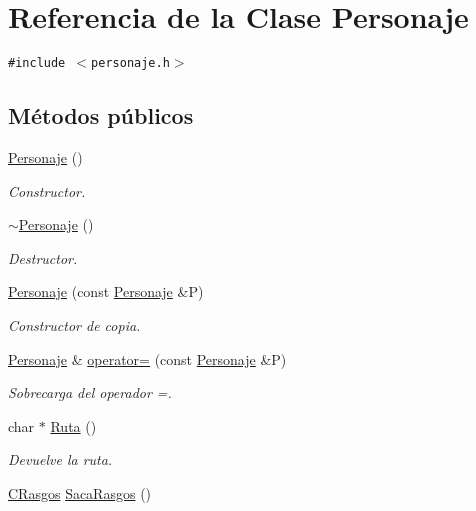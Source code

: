 \hypertarget{class_personaje}{
\section{Referencia de la Clase Personaje}
\label{class_personaje}
}
{\tt \#include $<$personaje.h$>$}

\subsection*{Métodos públicos}
\begin{CompactItemize}
\item 
\hyperlink{class_personaje_9238a75aae652b20dd423e85cfa1ee17}{Personaje} ()
\begin{CompactList}\small\item\em Constructor. \item\end{CompactList}\item 
\hyperlink{class_personaje_0b3c25862a6081aaee96e77c08edda29}{$\sim$Personaje} ()
\begin{CompactList}\small\item\em Destructor. \item\end{CompactList}\item 
\hyperlink{class_personaje_894a1e3daf9e5d7799e7c875c919bdb5}{Personaje} (const \hyperlink{class_personaje}{Personaje} \&P)
\begin{CompactList}\small\item\em Constructor de copia. \item\end{CompactList}\item 
\hyperlink{class_personaje}{Personaje} \& \hyperlink{class_personaje_c2d42e675ece1b69dbe59aa45b321774}{operator=} (const \hyperlink{class_personaje}{Personaje} \&P)
\begin{CompactList}\small\item\em Sobrecarga del operador =. \item\end{CompactList}\item 
char $\ast$ \hyperlink{class_personaje_97e98c33ff950a88922643931307a70b}{Ruta} ()
\begin{CompactList}\small\item\em Devuelve la ruta. \item\end{CompactList}\item 
\hyperlink{class_c_rasgos}{CRasgos} \hyperlink{class_personaje_cfb48d84c94995523b450797e2c7a72f}{SacaRasgos} ()

\end{CompactItemize}
